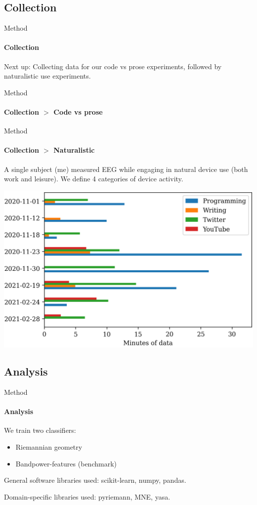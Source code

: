 \documentclass[xcolor={dvipsnames,table},12pt]{beamer}
\begin{document}
\subsection{Collection}
\begin{frame}{Method}
    \framesubtitle{Collection}

    Next up: Collecting data for our code vs prose experiments, followed by naturalistic use experiments.
\end{frame}

\begin{frame}{Method}
    \framesubtitle{Collection $>$ Code vs prose}
    {
        \small
        
    }
\end{frame}

\begin{frame}{Method}
    \framesubtitle{Collection $>$ Naturalistic}
    A single subject (me) measured EEG while engaging in natural device use (both work and leisure). We define 4 categories of device activity.

    \begin{adjustbox}{width=0.7\textwidth,center,float=table}
        \includegraphics{img/naturalistic-dayclass-dist.png}
    \end{adjustbox}
\end{frame}

\subsection{Analysis}
\begin{frame}{Method}
    \framesubtitle{Analysis}

    We train two classifiers:
    \begin{itemize}
        \item Riemannian geometry
        \item Bandpower-features (benchmark)
    \end{itemize}

    General software libraries used:  scikit-learn, numpy, pandas.

    Domain-specific libraries used:  pyriemann, MNE, yasa.
\end{frame}
\end{document}
